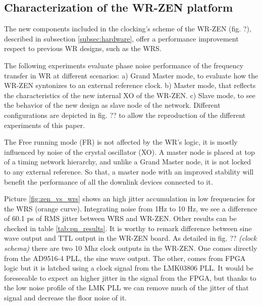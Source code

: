 \subsection{Characterization of the WR-ZEN platform}
\label{subsec: charact_zen}


The new components included in the clocking's scheme of the WR-ZEN (fig. ?), described in subsection \ref{subsec:hardware}, offer a performance improvement respect to previous WR designs, such as the WRS. 


The following experiments evaluate phase noise performance of the frequency transfer in WR at different scenarios: a) Grand Master mode, to evaluate how the WR-ZEN syntonizes to an external reference clock. b) Master mode, that reflects the characteristics of the new internal XO of the WR-ZEN. c) Slave mode, to see the behavior of the new design as slave node of the network. Different configurations are depicted in fig. ?? to allow the reproduction of the different experiments of this paper.


The Free running mode (FR) is not affected by the WR's logic, it is mostly influenced by noise of the crystal oscillator (XO). A master node is placed at top of a timing network hierarchy, and unlike a Grand Master node, it is not locked to any external reference. So that, a master node with an improved stability will benefit the performance of all the downlink devices connected to it.

Picture \ref{fig:zen_vs_wrs} shows an high jitter accumulation in low frequencies for the WRS (orange curve). Integrating noise from 1Hz to 10 Hz, we see a difference of 60.1 ps of RMS jitter between WRS and WR-ZEN. Other results can be checked in table \ref{tab:pn_results}. It is worthy to remark difference between sine wave output and TTL output in the WR-ZEN board. As detailed in fig. ?? \textit{(clock schema)} there are two 10 Mhz clock outputs in the WR-ZEN. One comes directly from the AD9516-4 PLL, the sine wave output. The other, comes from FPGA logic but it is latched using a clock signal from the LMK03806 PLL. It would be foreseeable to expect an higher jitter in the signal from the FPGA, but thanks to the low noise profile of the LMK PLL we can remove much of the jitter of that signal and decrease the floor noise of it.

